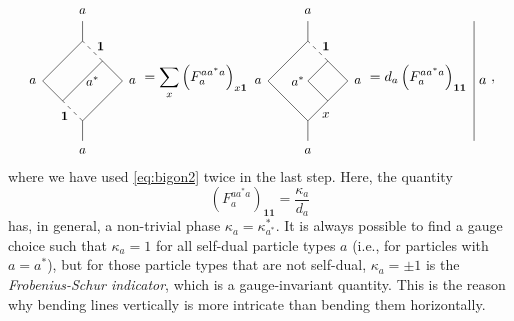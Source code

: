 	\begin{equation}
	\label{eq:FrobSchur}
		\begin{tikzpicture}[baseline=(current bounding box.center)]
			\draw (0,0) -- (0,0.5);
			\draw (0,0.5) -- (1,1.5);
			\draw[dashed] (0,0.5) to node[left, near start] {\small $\mathbf{1}\ $} (-0.5,1);
			\draw (1,1.5) -- (0.5,2);
			\draw (0.5,2) -- (-0.5,1);
			\draw[dashed] (0.5,2) to node[right, near end] {\small $\ \mathbf{1}$} (0,2.5);
			\draw (-0.5,1) -- (-1,1.5);
			\draw (-1,1.5) -- (0,2.5);
			\draw (0,2.5) -- (0,3);
			\node at (0,-0.25) {\small $a$};
			\node at (0,3.25) {\small $a$};
			\node at (1.25,1.5) {\small $a$};
			\node at (-1.25,1.5) {\small $a$};
			\node at (0.25,1.5) {\small $a^*$};
		\end{tikzpicture}=\sum_x\left(F_a^{aa^*a}\right)_{x\mathbf{1}}
		\begin{tikzpicture}[baseline=(current bounding box.center)]
			\draw (0,0) -- (0,0.5);
			\draw (0,0.5) -- (1,1.5);
			\draw (0,0.5) -- (-0.5,1);
			\draw (1,1.5) -- (0.5,2);
			\draw (0.5,2) -- (0,1.5) -- (0.5,1);
			\draw[dashed] (0.5,2) to node[right, near end] {\small $\ \mathbf{1}$} (0,2.5);
			\draw (-0.5,1) -- (-1,1.5);
			\draw (-1,1.5) -- (0,2.5);
			\draw (0,2.5) -- (0,3);
			\node at (0,-0.25) {\small $a$};
			\node at (0,3.25) {\small $a$};
			\node at (1.25,1.5) {\small $a$};
			\node at (-1.25,1.5) {\small $a$};
			\node at (-0.25,1.5) {\small $a^*$};
			\node at (0.45,0.65) {\small $x$};
		\end{tikzpicture}=d_a\left(F_a^{aa^*a}\right)_{\mathbf{1}\mathbf{1}}\ 
		\begin{tikzpicture}[baseline=(current bounding box.center)]
			\draw (0,0) to node[right] {$a$} (0,3);
		\end{tikzpicture},
	\end{equation}
where we have used \cref{eq:bigon2} twice in the last step. Here, the quantity
	\begin{equation}
	\label{eq:FrobSchur2}
		\left(F_a^{aa^*a}\right)_{\mathbf{1}\mathbf{1}}=\frac{\kappa_a}{d_a}
	\end{equation}
has, in general, a non-trivial phase $\kappa_a=\kappa_{a^*}^*$. It is always possible to find a gauge choice such that $\kappa_a=1$ for all self-dual particle types $a$ (i.e., for particles with $a=a^*$), but for those particle types that are not self-dual, $\kappa_a=\pm 1$ is the \emph{Frobenius-Schur indicator}, which is a gauge-invariant quantity. This is the reason why bending lines vertically is more intricate than bending them horizontally. 

